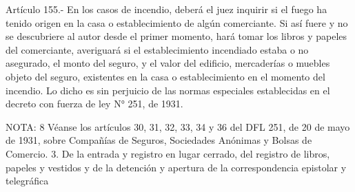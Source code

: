     Artículo 155.- En los casos de incendio, deberá el juez inquirir si el fuego ha tenido origen en la casa o establecimiento de algún comerciante.
      Si así fuere y no se descubriere al autor desde el primer momento, hará tomar los libros y papeles del comerciante, averiguará si el establecimiento incendiado estaba o no asegurado, el monto del seguro, y el valor del edificio, mercaderías o muebles objeto del seguro, existentes en la casa o establecimiento en el momento del incendio.
    Lo dicho es sin perjuicio de las normas especiales establecidas en el decreto con fuerza de ley N° 251, de 1931.

NOTA: 8
    Véanse los artículos 30, 31, 32, 33, 34 y 36 del DFL 251, de 20 de mayo de 1931, sobre Compañías de Seguros, Sociedades Anónimas y Bolsas de Comercio.
  3. De la entrada y registro en lugar cerrado, del registro de libros, papeles y vestidos y de la detención y apertura de la correspondencia epistolar y telegráfica

